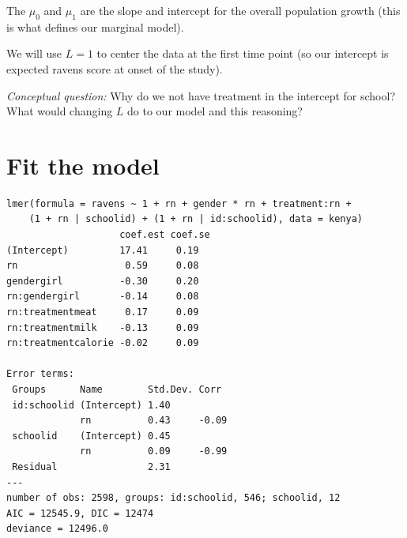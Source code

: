 \documentclass[
  letterpaper,
  DIV=11,
  numbers=noendperiod]{scrreprt}
\newenvironment{Shaded}{\begin{snugshade}}{\end{snugshade}}
\newcommand{\AttributeTok}[1]{\textcolor[rgb]{0.49,0.56,0.16}{#1}}
\newcommand{\CommentTok}[1]{\textcolor[rgb]{0.38,0.63,0.69}{\textit{#1}}}
\newcommand{\DecValTok}[1]{\textcolor[rgb]{0.25,0.63,0.44}{#1}}
\newcommand{\FunctionTok}[1]{\textcolor[rgb]{0.02,0.16,0.49}{#1}}
\newcommand{\NormalTok}[1]{\textcolor[rgb]{0.00,0.44,0.13}{#1}}
\newcommand{\OtherTok}[1]{\textcolor[rgb]{0.00,0.44,0.13}{#1}}
\newcommand{\SpecialCharTok}[1]{\textcolor[rgb]{0.25,0.44,0.63}{#1}}
\begin{document}
The \(\mu_0\) and \(\mu_1\) are the slope and intercept for the overall
population growth (this is what defines our marginal model).

We will use \(L = 1\) to center the data at the first time point (so our
intercept is expected ravens score at onset of the study).

\emph{Conceptual question:} Why do we not have treatment in the
intercept for school? What would changing \(L\) do to our model and this
reasoning?

\hypertarget{fit-the-model-1}{%
\section{Fit the model}\label{fit-the-model-1}}

\begin{Shaded}
\end{Shaded}

\begin{verbatim}
lmer(formula = ravens ~ 1 + rn + gender * rn + treatment:rn + 
    (1 + rn | schoolid) + (1 + rn | id:schoolid), data = kenya)
                    coef.est coef.se
(Intercept)         17.41     0.19  
rn                   0.59     0.08  
gendergirl          -0.30     0.20  
rn:gendergirl       -0.14     0.08  
rn:treatmentmeat     0.17     0.09  
rn:treatmentmilk    -0.13     0.09  
rn:treatmentcalorie -0.02     0.09  

Error terms:
 Groups      Name        Std.Dev. Corr  
 id:schoolid (Intercept) 1.40           
             rn          0.43     -0.09 
 schoolid    (Intercept) 0.45           
             rn          0.09     -0.99 
 Residual                2.31           
---
number of obs: 2598, groups: id:schoolid, 546; schoolid, 12
AIC = 12545.9, DIC = 12474
deviance = 12496.0 
\end{verbatim}
\end{document}
